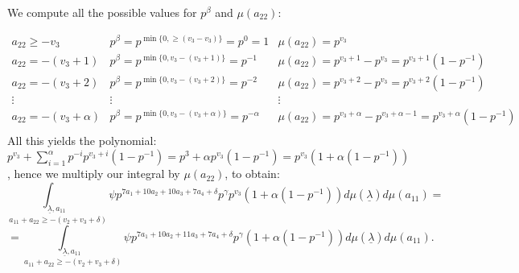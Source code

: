 \documentclass{article}
\begin{document}
We compute all the possible values for $p^{\beta}$ and $\mu(a_{22})$:

\[\begin{matrix}
a_{22}\geq{-v_3}&p^{\beta}=p^{\min\{0,\geq({v_3}-v_3)\}}=p^0=1&\mu(a_{22})=p^{v_3}\\
a_{22}={-(v_3+1)}&p^{\beta}=p^{\min\{0,v_3-(v_3+1)\}}=p^{-1}&\mu(a_{22})=p^{v_3+1}-p^{v_3}=p^{v_3+1}(1-p^{-1})\\
a_{22}={-(v_3+2)}&p^{\beta}=p^{\min\{0,v_3-(v_3+2)\}}=p^{-2}&\mu(a_{22})=p^{v_3+2}-p^{v_3}=p^{v_3+2}(1-p^{-1})\\
\vdots&\vdots&\vdots\\
a_{22}={-(v_3+\alpha)}&p^{\beta}=p^{\min\{0,v_3-(v_3+\alpha)\}}=p^{-\alpha}&\mu(a_{22})=p^{v_3+\alpha}-p^{v_3+\alpha-1}=p^{v_3+\alpha}(1-p^{-1})\\
\end{matrix}\]
All this yields the polynomial: \\
$p^{v_3}+\sum_{i=1}^{\alpha}p^{-i}p^{v_3+i}(1-p^{-1})=p^{3}+\alpha{p}^{v_3}(1-p^{-1})=p^{v_3}(1+\alpha(1-p^{-1}))$, hence we multiply our integral by $\mu(a_{22})$, to obtain:
\[\underset{a_{11}+a_{22}\geq-(v_2+v_3+\delta)}{\int_{\underline\lambda,a_{11}}}\psi{p}^{7a_1+10a_2+10a_3+7a_4+\delta}p^{\gamma}p^{v_3}(1+\alpha(1-p^{-1}))d\mu(\underline\lambda)d\mu(a_{11})=\]\[=\underset{a_{11}+a_{22}\geq-(v_2+v_3+\delta)}{\int_{\underline\lambda,a_{11}}}\psi{p}^{7a_1+10a_2+11a_3+7a_4+\delta}p^{\gamma}(1+\alpha(1-p^{-1}))d\mu(\underline\lambda)d\mu(a_{11}).\]
\end{document}
